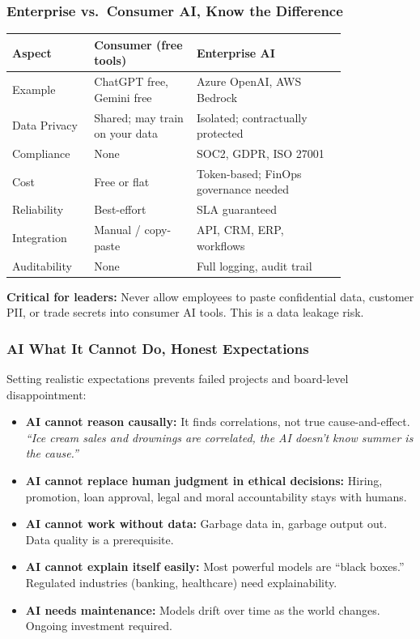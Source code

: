 \begin{frame}[fragile]\frametitle{Enterprise vs.\ Consumer AI, Know the Difference}

\begin{center}
\begin{tabular}{|p{0.18\linewidth}|p{0.26\linewidth}|p{0.38\linewidth}|}
\hline
\textbf{Aspect} & \textbf{Consumer (free tools)} & \textbf{Enterprise AI} \\
\hline
Example & ChatGPT free, Gemini free & Azure OpenAI, AWS Bedrock \\
Data Privacy & Shared; may train on your data & Isolated; contractually protected \\
Compliance & None & SOC2, GDPR, ISO 27001 \\
Cost & Free or flat & Token-based; FinOps governance needed \\
Reliability & Best-effort & SLA guaranteed \\
Integration & Manual / copy-paste & API, CRM, ERP, workflows \\
Auditability & None & Full logging, audit trail \\
\hline
\end{tabular}
\end{center}

\vspace{0.3em}
\textbf{Critical for leaders:} Never allow employees to paste confidential data, customer PII, or trade secrets into consumer AI tools. This is a data leakage risk.

\end{frame}

\begin{frame}[fragile]\frametitle{AI What It Cannot Do, Honest Expectations}

Setting realistic expectations prevents failed projects and board-level disappointment:
\begin{itemize}
  \item \textbf{AI cannot reason causally:} It finds correlations, not true cause-and-effect.\\
    \textit{``Ice cream sales and drownings are correlated, the AI doesn't know summer is the cause.''}
  \item \textbf{AI cannot replace human judgment in ethical decisions:} Hiring, promotion, loan approval, legal and moral accountability stays with humans.
  \item \textbf{AI cannot work without data:} Garbage data in, garbage output out. Data quality is a prerequisite.
  \item \textbf{AI cannot explain itself easily:} Most powerful models are ``black boxes.'' Regulated industries (banking, healthcare) need explainability.
  \item \textbf{AI needs maintenance:} Models drift over time as the world changes. Ongoing investment required.
\end{itemize}

\end{frame}


